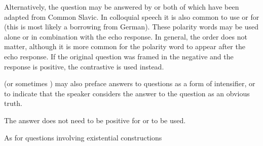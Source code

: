 \ex
{}
\xe

Alternatively, the question may be answered by  or  both of which have been adapted from Common Slavic. In colloquial speech it is also common to use  or  for  (this is most likely a borrowing from German). These polarity words may be used alone or in combination with the echo response. In general, the order does not matter, although it is more common for the polarity word to appear after the echo response. If the original question was framed in the negative and the response is positive, the contrastive  is used instead.

\ex
{}\xe

\ex{}
\xe

 (or sometimes ) may also preface answers to questions as a form of intensifier, or to indicate that the speaker considers the answer to the question as an obvious truth.

\ex
{}\xe

The answer does not need to be positive for  or  to be used.

\ex{}
\xe


As for questions involving existential constructions


